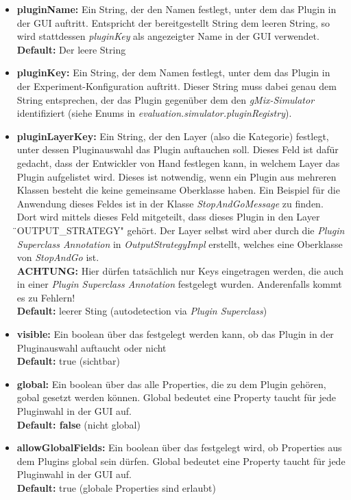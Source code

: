 \documentclass[a4paper, 11pt]{article} %
\begin{document}
\begin{itemize}
	\item \textbf{pluginName:} Ein String, der den Namen festlegt, unter dem das Plugin in der GUI auftritt. Entspricht der bereitgestellt String dem leeren String, so wird stattdessen \emph{pluginKey} als angezeigter Name in der GUI verwendet.\\
	\textbf{Default:} Der leere String
	\item \textbf{pluginKey:} Ein String, der dem Namen festlegt, unter dem das Plugin in der Experiment-Konfiguration auftritt. Dieser String muss dabei genau dem String entsprechen, der das Plugin gegenüber dem den \emph{gMix-Simulator} identifiziert (siehe Enums in \emph{evaluation.simulator.pluginRegistry}).
	\item \textbf{pluginLayerKey:} Ein String, der den Layer (also die Kategorie) festlegt, unter dessen Pluginauswahl das Plugin auftauchen soll. Dieses Feld ist dafür gedacht, dass der Entwickler von Hand festlegen kann, in welchem Layer das Plugin aufgelistet wird. Dieses ist notwendig, wenn ein Plugin aus mehreren Klassen besteht die keine gemeinsame Oberklasse haben. Ein Beispiel für die Anwendung dieses Feldes ist in der Klasse \emph{StopAndGoMessage} zu finden. Dort wird mittels dieses Feld mitgeteilt, dass dieses Plugin in den Layer \"{}OUTPUT\_STRATEGY" gehört. Der Layer selbst wird aber durch die \emph{Plugin Superclass Annotation} in \emph{OutputStrategyImpl} erstellt, welches eine Oberklasse von \emph{StopAndGo} ist. \\
	\textbf{ACHTUNG:} Hier dürfen tatsächlich nur Keys eingetragen werden, die auch in einer \emph{Plugin Superclass Annotation} festgelegt wurden. Anderenfalls kommt es zu Fehlern!\\
	\textbf{Default:} leerer Sting (autodetection via \emph{Plugin Superclass})
	\item \textbf{visible:}	Ein boolean über das festgelegt werden kann, ob das Plugin in der Pluginauswahl auftaucht oder nicht\\
	\textbf{Default:} true (sichtbar)
	\item \textbf{global:} Ein boolean über das alle Properties, die zu dem Plugin gehören, gobal gesetzt werden können. Global bedeutet eine Property taucht für jede Pluginwahl in der GUI auf.\\
	\textbf{Default: false} (nicht global)
	\item \textbf{allowGlobalFields:} Ein boolean über das festgelegt wird, ob Properties aus dem Plugins global sein dürfen. Global bedeutet eine Property taucht für jede Pluginwahl in der GUI auf.\\
	\textbf{Default:} true (globale Properties sind erlaubt)
\end{itemize}
\end{document}
